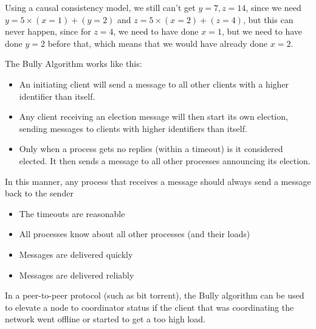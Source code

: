 Using a causal consistency model, we still can't get $y=7, z=14$, since we need
$y = 5 \times (x = 1) + (y = 2)$ and $z = 5 \times (x = 2) + (z = 4)$, but this
can never happen, since for $z = 4$, we need to have done $x = 1$, but  we need
to have done $y = 2$ before that, which means that we would have already done $x
= 2$.

\newpage


The Bully Algorithm works like this:

\begin{itemize}
\item An initiating client will send a message to all other clients with a
higher identifier than itself.
\item Any client receiving an election message will then start its own 
election, sending messages to clients with higher identifiers than itself.
\item Only when a process gets no replies (within a timeout) is it considered
elected. It then sends a message to all other processes announcing its election.
\end{itemize}

In this manner, any process that receives a message should always send a message
back to the sender


\begin{itemize}
  \item The timeouts are reasonable
  \item All processes know about all other processes (and their loads)
  \item Messages are delivered quickly
  \item Messages are delivered reliably
\end{itemize}


In a peer-to-peer protocol (such as bit torrent), the Bully algorithm can be
used to elevate a node to coordinator status if the client that was coordinating
the network went offline or started to get a too high load.


